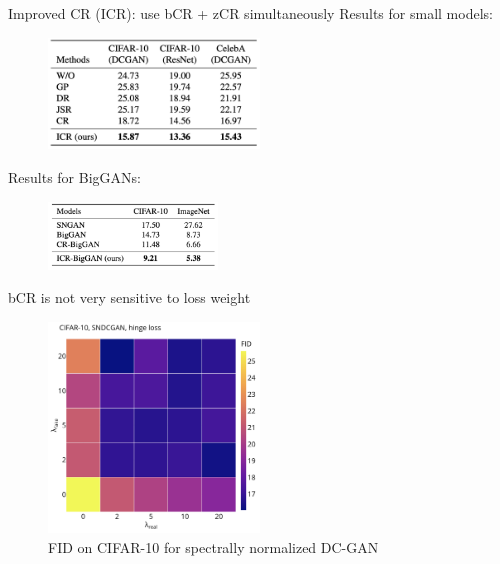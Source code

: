 \documentclass[handout, 10pt]{beamer}
\begin{document}
\begin{frame}{Improved CR (ICR): use bCR + zCR simultaneously}
Results for small models:
\begin{figure}
    \centering
    \includegraphics[width=0.5\textwidth]{images/icr-results-small-models.png}
\end{figure}

Results for BigGANs:
\begin{figure}
    \centering
    \includegraphics[width=0.4\textwidth]{images/icr-results-biggan.png}
\end{figure}
\end{frame}


\begin{frame}{bCR is not very sensitive to loss weight}
\begin{figure}
\centering
\includegraphics[width=0.5\textwidth]{images/bcr-loss-weights-sensitivity}
\caption{FID on CIFAR-10 for spectrally normalized DC-GAN}
\end{figure}
\end{frame}
\end{document}
